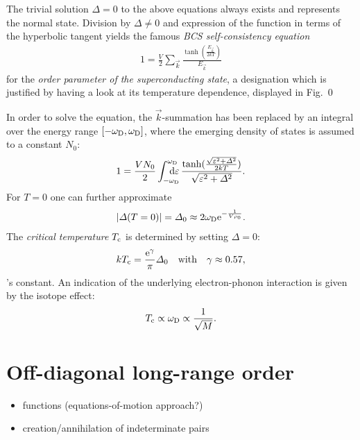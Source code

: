 The trivial solution $\Delta = 0$ to the above equations always exists and
represents the normal state. Division by $\Delta \neq 0$ and expression of the
 function in terms of the hyperbolic tangent yields the famous
\emph{BCS self-consistency equation}
%
\begin{gather*}
    1 = \frac V 2 \sum_{\vec k}
    \frac{\tanh(\frac{E_{\vec k}}{2 k T})}{E_{\vec k}}
\end{gather*}
%
for the \emph{order parameter of the superconducting state}, a designation which
is justified by having a look at its temperature dependence, displayed in Fig.~0

In order to solve the equation, the $\vec k$-summation has been replaced by an
integral over the energy range $[-\omega \sb{\text{D}}, \omega \sb{\text{D}}]$, where the
emerging density of states is assumed to a constant $N_0$:
%
\begin{gather*}
    1 = \frac {V N_0} 2
    \int \from{-\omega \sub D} \till{\omega \sub D} \D \epsilon \,
    \frac
        {\tanh(\frac{\sqrt{\epsilon^2 + \Delta^2}}{2 k T})}
        {\sqrt{\epsilon^2 + \Delta^2}}.
\end{gather*}
%
For $T = 0$ one can further approximate
%
\begin{gather*}
    |\varDelta(T = 0)| = \varDelta_0 \approx 2 \omega \sb{\text{D}} \mathrm e^{-\frac 1 {V \rho_0}}.
\end{gather*}
%
The \emph{critical temperature} $T \sb{\text{c}}$ is determined by setting $\Delta =
0$:
%
\begin{gather*}
    k T \sb{\text{c}} = \frac {\mathrm e^\gamma} \pi \varDelta_0
    \quad \text{with} \quad \gamma \approx 0.57,
\end{gather*}
%
's constant. An indication of the underlying electron-phonon
interaction is given by the isotope effect:
%
\begin{gather*}
    T \sb{\text{c}} \propto \omega \sb{\text{D}} \propto \frac 1 {\sqrt M}.
\end{gather*}

\begin{figure}
    
\end{figure}

\section{Off-diagonal long-range order}

\begin{itemize}
    \item {} functions (equations-of-motion approach?)
    \item creation/annihilation of indeterminate  pairs
\end{itemize}
